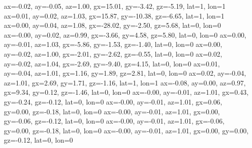 ax=-0.02, ay=-0.05, az=1.00, gx=15.01, gy=-3.42, gz=-5.19, lat=1, lon=1
ax=0.01, ay=0.02, az=1.03, gx=15.87, gy=-10.38, gz=-6.65, lat=1, lon=1
ax=0.00, ay=0.04, az=1.08, gx=-28.02, gy=-2.50, gz=5.68, lat=0, lon=0
ax=-0.00, ay=0.02, az=0.99, gx=-3.66, gy=4.58, gz=5.80, lat=0, lon=0
ax=0.00, ay=-0.01, az=1.03, gx=-5.86, gy=-1.53, gz=-1.40, lat=0, lon=0
ax=0.00, ay=-0.02, az=1.00, gx=-2.01, gy=-2.62, gz=-0.55, lat=0, lon=0
ax=0.02, ay=-0.02, az=1.04, gx=-2.69, gy=-9.40, gz=4.15, lat=0, lon=0
ax=0.01, ay=-0.04, az=1.01, gx=1.16, gy=1.89, gz=2.81, lat=0, lon=0
ax=0.02, ay=-0.04, az=1.01, gx=2.69, gy=1.71, gz=-1.16, lat=1, lon=1
ax=-0.08, ay=0.00, az=0.97, gx=9.34, gy=0.12, gz=-1.46, lat=0, lon=0
ax=-0.00, ay=-0.01, az=1.01, gx=0.43, gy=-0.24, gz=-0.12, lat=0, lon=0
ax=-0.00, ay=-0.01, az=1.01, gx=0.06, gy=0.00, gz=-0.18, lat=0, lon=0
ax=-0.00, ay=-0.01, az=1.01, gx=0.00, gy=-0.06, gz=-0.12, lat=0, lon=0
ax=-0.00, ay=-0.01, az=1.01, gx=-0.06, gy=0.00, gz=-0.18, lat=0, lon=0
ax=-0.00, ay=-0.01, az=1.01, gx=0.00, gy=0.00, gz=-0.12, lat=0, lon=0
